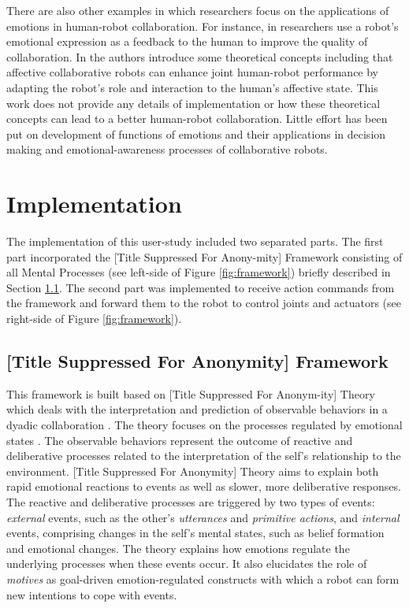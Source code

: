 \documentclass{sig-alternate-05-2015}
\begin{document}
There are also other examples in which researchers focus on the applications of
emotions in human-robot collaboration. For instance, in
\cite{guha:emotion-feedback} researchers use a robot's emotional expression as a
feedback to the human to improve the quality of collaboration. In
\cite{looije:affective-collaboration-safety} the authors introduce some
theoretical concepts including that affective collaborative robots can enhance
joint human-robot performance by adapting the robot's role and interaction to
the human's affective state. This work does not provide any details of
implementation or how these theoretical concepts can lead to a better
human-robot collaboration. Little effort has been put on development of
functions of emotions and their applications in decision making and
emotional-awareness processes of collaborative robots.

\section{Implementation}
The implementation of this user-study included two separated parts. The first
part incorporated the [Title Suppressed For Anony-mity] Framework consisting of
all Mental Processes (see left-side of Figure \ref{fig:framework}) briefly
described in Section \ref{sec:theory}. The second part was implemented to
receive action commands from the framework and forward them to the robot to
control joints and actuators (see right-side of Figure \ref{fig:framework}).

\subsection{[Title Suppressed For Anonymity] Framework}
\label{sec:theory}
This framework is built based on [Title Suppressed For Anonym-ity] Theory which
deals with the interpretation and prediction of observable behaviors in a dyadic
collaboration \cite{shayganfar:theory-overview}. The theory focuses on the
processes regulated by emotional states \cite{shayganfar:goal-management}. The
observable behaviors represent the outcome of reactive and deliberative
processes related to the interpretation of the self's relationship to the
environment. [Title Suppressed For Anonymity] Theory aims to explain both rapid
emotional reactions to events as well as slower, more deliberative responses.
The reactive and deliberative processes are triggered by two types of events:
\textit{external} events, such as the other's \textit{utterances} and
\textit{primitive actions}, and \textit{internal} events, comprising changes in
the self's mental states, such as belief formation and emotional changes. The
theory explains how emotions regulate the underlying processes when these events
occur. It also elucidates the role of \textit{motives} as goal-driven
emotion-regulated constructs with which a robot can form new intentions to cope
with events.
\end{document}

